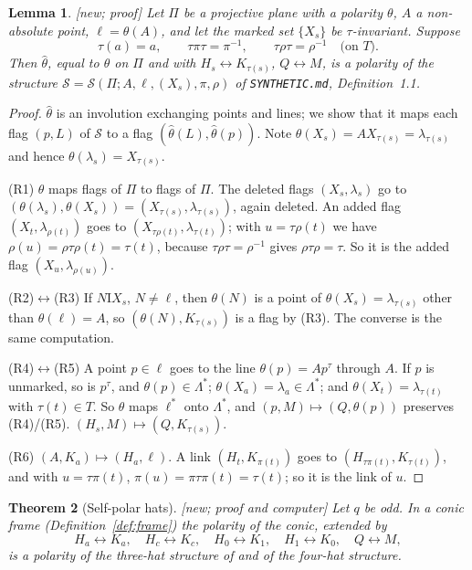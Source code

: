 \documentclass[11pt]{amsart}
\newtheorem{theorem}{Theorem}[section]
\newtheorem{lemma}[theorem]{Lemma}
\theoremstyle{definition}
\theoremstyle{remark}
\newcommand{\I}{\mathrel{\mathrm{I}}}
\newcommand{\cS}{\mathcal{S}}
\newcommand{\lam}{\lambda}
\newcommand{\status}[1]{\textup{[#1]}}
\begin{document}
\begin{lemma}\label{lem:criterion}
\status{new; proof} Let $\Pi$ be a projective plane with a polarity $\theta$, $A$ a non-absolute point,
$\ell=\theta(A)$, and let the marked set $\{X_s\}$ be $\tau$-invariant. Suppose
$$\tau(a)=a,\qquad \tau\pi\tau=\pi^{-1},\qquad \tau\rho\tau=\rho^{-1}\quad\text{(on $T$)}.$$
Then $\hat\theta$, equal to $\theta$ on $\Pi$ and with $H_s\leftrightarrow K_{\tau(s)}$, $Q\leftrightarrow M$, is a
polarity of the structure $\cS=\cS(\Pi;A,\ell,(X_s),\pi,\rho)$ of \texttt{SYNTHETIC.md}, Definition~1.1.
\end{lemma}

\begin{proof}
$\hat\theta$ is an involution exchanging points and lines; we show that it maps each flag $(p,L)$ of $\cS$ to a
flag $(\hat\theta(L),\hat\theta(p))$. Note $\theta(X_s)=AX_{\tau(s)}=\lam_{\tau(s)}$ and hence
$\theta(\lam_s)=X_{\tau(s)}$.

(R1) $\theta$ maps flags of $\Pi$ to flags of $\Pi$. The deleted flags $(X_s,\lam_s)$ go to
$(\theta(\lam_s),\theta(X_s))=(X_{\tau(s)},\lam_{\tau(s)})$, again deleted. An added flag $(X_t,\lam_{\rho(t)})$ goes
to $(X_{\tau\rho(t)},\lam_{\tau(t)})$; with $u=\tau\rho(t)$ we have $\rho(u)=\rho\tau\rho(t)=\tau(t)$, because
$\tau\rho\tau=\rho^{-1}$ gives $\rho\tau\rho=\tau$. So it is the added flag $(X_u,\lam_{\rho(u)})$.

(R2)$\leftrightarrow$(R3) If $N\I X_s$, $N\ne\ell$, then $\theta(N)$ is a point of $\theta(X_s)=\lam_{\tau(s)}$ other
than $\theta(\ell)=A$, so $(\theta(N),K_{\tau(s)})$ is a flag by (R3). The converse is the same computation.

(R4)$\leftrightarrow$(R5) A point $p\in\ell$ goes to the line $\theta(p)=Ap^\tau$ through $A$. If $p$ is unmarked,
so is $p^\tau$, and $\theta(p)\in\Lambda^*$; $\theta(X_a)=\lam_a\in\Lambda^*$; and $\theta(X_t)=\lam_{\tau(t)}$ with
$\tau(t)\in T$. So $\theta$ maps $\ell^*$ onto $\Lambda^*$, and $(p,M)\mapsto(Q,\theta(p))$ preserves (R4)/(R5).
$(H_s,M)\mapsto(Q,K_{\tau(s)})$.

(R6) $(A,K_a)\mapsto(H_a,\ell)$. A link $(H_t,K_{\pi(t)})$ goes to $(H_{\tau\pi(t)},K_{\tau(t)})$, and with
$u=\tau\pi(t)$, $\pi(u)=\pi\tau\pi(t)=\tau(t)$; so it is the link of $u$.
\end{proof}

\begin{theorem}[Self-polar hats]\label{thm:selfpolar}
\status{new; proof and computer} Let $q$ be odd. In a conic frame (Definition~\ref{def:frame}) the polarity of the
conic, extended by
$$H_a\leftrightarrow K_a,\quad H_c\leftrightarrow K_c,\quad H_0\leftrightarrow K_1,\quad H_1\leftrightarrow K_0,
\quad Q\leftrightarrow M,$$
is a polarity of the three-hat structure of \cite{AL20} and of the four-hat structure.
\end{theorem}
\end{document}

